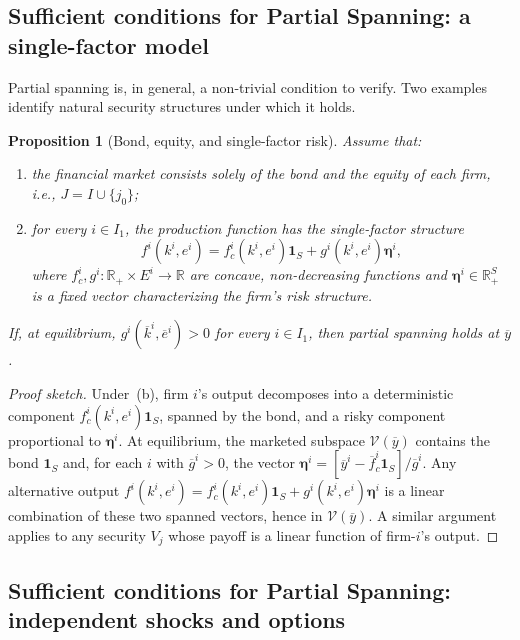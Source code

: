 \documentclass[11pt,a4paper,oneside]{book}
\def\R{\mathbb{R}}
\def\1{\mathbf{1}}
\theoremstyle{plain}
\newtheorem{proposition}[theorem]{Proposition}
\theoremstyle{definition}
\theoremstyle{remark}
\numberwithin{equation}{chapter}
\begin{document}
\subsection{Sufficient conditions for Partial Spanning: a single-factor model}

Partial spanning is, in general, a non-trivial condition to verify.
Two examples identify natural security structures under which it holds.

\begin{proposition}[Bond, equity, and single-factor risk]\label{prop:PS-single-factor}
Assume that:
\begin{enumerate}
  \item[\textup{(a)}] the financial market consists solely of the bond and the equity of each firm, i.e., $J = I \cup \{j_0\}$;
  \item[\textup{(b)}] for every $i \in I_1$, the production function has the single-factor structure
  \begin{equation}\label{eq:single-factor}
    f^i(k^i, e^i) = f^i_c(k^i, e^i) \1_S + g^i(k^i, e^i) \bm{\eta}^i,
  \end{equation}
  where $f^i_c, g^i : \R_+ \times E^i \to \R$ are concave, non-decreasing functions and $\bm{\eta}^i \in \R_+^S$ is a fixed vector characterizing the firm's risk structure.
\end{enumerate}
If, at equilibrium, $g^i(\overline{k}^i, \overline{e}^i) > 0$ for every $i \in I_1$, then partial spanning holds at $\overline{y}$.
\end{proposition}

\begin{proof}[Proof sketch]
Under~(b), firm $i$'s output decomposes into a deterministic component $f^i_c(k^i, e^i) \1_S$, spanned by the bond, and a risky component proportional to $\bm{\eta}^i$.
At equilibrium, the marketed subspace $\mathcal{V}(\overline{y})$ contains the bond $\1_S$ and, for each $i$ with $\overline{g}^i > 0$, the vector $\bm{\eta}^i = [\overline{y}^i - \overline{f}^i_c \1_S] / \overline{g}^i$.
Any alternative output $f^i(k^i, e^i) = f^i_c(k^i, e^i) \1_S + g^i(k^i, e^i) \bm{\eta}^i$ is a linear combination of these two spanned vectors, hence in $\mathcal{V}(\overline{y})$.
A similar argument applies to any security $V_j$ whose payoff is a linear function of firm-$i$'s output.
\end{proof}

\subsection{Sufficient conditions for Partial Spanning: independent shocks and options}
\end{document}
